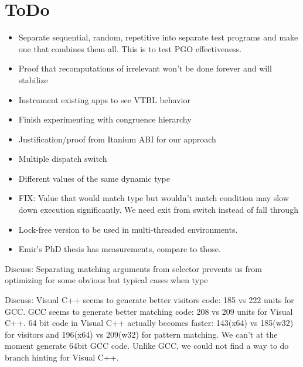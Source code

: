 \documentclass[preprint]{sigplanconf}
\begin{document}
\section{ToDo} %
\begin{itemize}
\item Separate sequential, random, repetitive into separate test programs
      and make one that combines them all. This is to test PGO effectiveness.
\item Proof that recomputations of irrelevant won't be done forever and will 
      stabilize
\item Instrument existing apps to see VTBL behavior
\item Finish experimenting with congruence hierarchy
\item Justification/proof from Itanium ABI for our approach
\item Multiple dispatch switch
\item Different values of the same dynamic type
\item FIX: Value that would match type but wouldn't match condition may slow 
      down execution significantly. We need exit from switch instead of fall 
      through
\item Lock-free version to be used in multi-threaded environments.
\item Emir's PhD thesis has measurements, compare to those.
\end{itemize}

Discuss: Separating matching arguments from selector prevents us from optimizing
for some obvious but typical cases when type 

Discuss:
Visual C++ seems to generate better visitors code: 185 vs 222 units for GCC.
GCC seems to generate better matching code: 208 vs 209 units for Visual C++.
64 bit code in Visual C++ actually becomes faster: 143(x64) vs 185(w32) for 
visitors and 196(x64) vs 209(w32) for pattern matching. We can't at the moment 
generate 64bit GCC code.
Unlike GCC, we could not find a way to do branch hinting for Visual C++.
\end{document}
